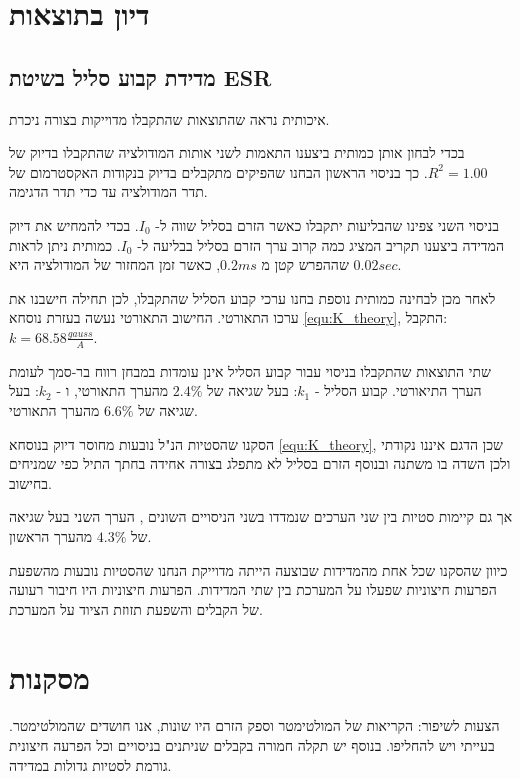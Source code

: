 \documentclass{article}
\begin{document}
\section{דיון בתוצאות}
\subsection{מדידת קבוע סליל בשיטת ESR}
איכותית נראה שהתוצאות שהתקבלו מדוייקות בצורה ניכרת.

בכדי לבחון אותן כמותית
ביצענו התאמות לשני אותות המודולציה שהתקבלו בדיוק של
$R^2 = 1.00$.
כך בניסוי הראשון הבחנו 
שהפיקים מתקבלים בדיוק בנקודות האקסטרמום של תדר המודולציה עד כדי תדר הדגימה.


בניסוי השני צפינו שהבליעות יתקבלו כאשר הזרם בסליל  שווה ל- 
$I_0$.
בכדי להמחיש את דיוק המדידה ביצענו תקריב המציג כמה קרוב ערך הזרם בסליל בבליעה ל-
$I_0$.
כמותית ניתן לראות שההפרש קטן מ
$0.2 ms$,
כאשר זמן המחזור של המודולציה היא
$0.02 sec$.


לאחר מכן לבחינה כמותית נוספת בחנו ערכי קבוע הסליל שהתקבלו, לכן תחילה חישבנו את ערכו התאורטי. החישוב התאורטי נעשה בעזרת נוסחא 
\ref{equ:K_theory},
התקבל:
$k = 68.58 \frac{gauss}{A}$.

שתי התוצאות שהתקבלו בניסוי עבור קבוע הסליל אינן עומדות במבחן רווח בר-סמך לעומת הערך התיאורטי.
קבוע הסליל -
$k_1$:
בעל שגיאה של
$2.4\%$
מהערך התאורטי,
ו -
$k_2$:
בעל שגיאה של
$6.6\%$
מהערך התאורטי.

הסקנו שהסטיות הנ"ל נובעות מחוסר דיוק בנוסחא 
\ref{equ:K_theory},
שכן הדגם איננו נקודתי ולכן השדה בו משתנה ובנוסף הזרם בסליל לא מתפלג בצורה אחידה בחתך התיל כפי שמניחים בחישוב.

אך גם קיימות סטיות בין שני הערכים שנמדדו בשני הניסויים השונים , הערך השני בעל שגיאה של 
$4.3\%$
מהערך הראשון.
 
כיוון שהסקנו שכל אחת מהמדידות שבוצעה הייתה מדוייקת הנחנו שהסטיות נובעות מהשפעת הפרעות חיצוניות שפעלו על המערכת בין שתי המדידות.
הפרעות חיצוניות היו חיבור רעועה של הקבלים והשפעת תזוזת הציוד על המערכת.
\section{מסקנות}
.הצעות לשיפור: הקריאות של המולטימטר וספק הזרם היו שונות, אנו חושדים שהמולטימטר בעייתי ויש להחליפו.
בנוסף יש תקלה חמורה בקבלים שניתנים בניסויים וכל הפרעה חיצונית גורמת לסטיות גדולות במדידה.
\end{document}
